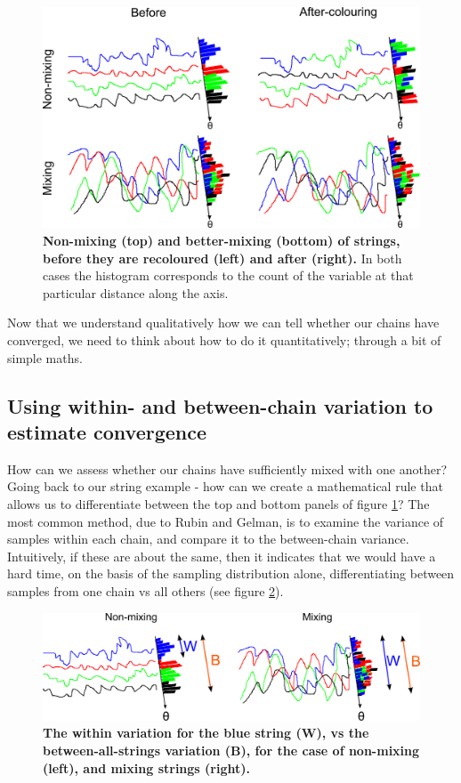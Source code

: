\documentclass[11pt,fullpage]{book}
\begin{document}
\begin{figure}
\centerline{\includegraphics[width=1\textwidth]{metropolisHastings_chainMixing.pdf}}
\caption{\textbf{Non-mixing (top) and better-mixing (bottom) of strings, before they are recoloured (left) and after (right).} In both cases the histogram corresponds to the count of the variable at that particular distance along the axis.}\label{fig:metropolisHastings_chainMixing}
\end{figure}


Now that we understand qualitatively how we can tell whether our chains have converged, we need to think about how to do it quantitatively; through a bit of simple maths.

\subsection{Using within- and between-chain variation to estimate convergence}
How can we assess whether our chains have sufficiently mixed with one another? Going back to our string example - how can we create a mathematical rule that allows us to differentiate between the top and bottom panels of figure \ref{fig:metropolisHastings_chainMixing}? The most common method, due to Rubin and Gelman, is to examine the variance of samples within each chain, and compare it to the between-chain variance. Intuitively, if these are about the same, then it indicates that we would have a hard time, on the basis of the sampling distribution alone, differentiating between samples from one chain vs all others (see figure \ref{fig:metropolisHastings_betweenWithinVarianceString}).

\begin{figure}
\centerline{\includegraphics[width=1\textwidth]{metropolisHastings_betweenWithinVarianceString.pdf}}
\caption{\textbf{The within variation for the blue string (W), vs the between-all-strings variation (B), for the case of non-mixing (left), and mixing strings (right).}}\label{fig:metropolisHastings_betweenWithinVarianceString}
\end{figure}
\end{document}
